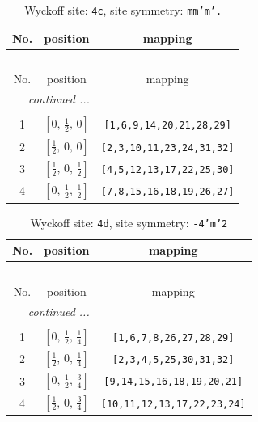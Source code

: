 \documentclass[fleqn,8pt]{jsarticle}
\begin{document}
\renewcommand{\arraystretch}{1.2}
\begin{longtable}{ccc}
\caption{Wyckoff site: {\tt 4c}, site symmetry: {\tt mm'm'.}}
 \\
 \hline \hline
No. & position & mapping \\ \hline \endfirsthead

\multicolumn{2}{l}{\tablename\ \thetable{}} \\
 \hline \hline
No. & position & mapping \\ \hline \endhead

 \hline \hline
\multicolumn{2}{r}{\footnotesize\it continued ...} \\ \endfoot

 \hline \hline
\multicolumn{2}{r}{} \\ \endlastfoot

1 & $\left[ 0,\, \frac{1}{2},\, 0 \right]$ & {\tt [1,6,9,14,20,21,28,29]} \\ \hline
2 & $\left[ \frac{1}{2},\, 0,\, 0 \right]$ & {\tt [2,3,10,11,23,24,31,32]} \\ \hline
3 & $\left[ \frac{1}{2},\, 0,\, \frac{1}{2} \right]$ & {\tt [4,5,12,13,17,22,25,30]} \\ \hline
4 & $\left[ 0,\, \frac{1}{2},\, \frac{1}{2} \right]$ & {\tt [7,8,15,16,18,19,26,27]} \\
\end{longtable}
\renewcommand{\arraystretch}{1.2}
\begin{longtable}{ccc}
\caption{Wyckoff site: {\tt 4d}, site symmetry: {\tt -4'm'2}}
 \\
 \hline \hline
No. & position & mapping \\ \hline \endfirsthead

\multicolumn{2}{l}{\tablename\ \thetable{}} \\
 \hline \hline
No. & position & mapping \\ \hline \endhead

 \hline \hline
\multicolumn{2}{r}{\footnotesize\it continued ...} \\ \endfoot

 \hline \hline
\multicolumn{2}{r}{} \\ \endlastfoot

1 & $\left[ 0,\, \frac{1}{2},\, \frac{1}{4} \right]$ & {\tt [1,6,7,8,26,27,28,29]} \\ \hline
2 & $\left[ \frac{1}{2},\, 0,\, \frac{1}{4} \right]$ & {\tt [2,3,4,5,25,30,31,32]} \\ \hline
3 & $\left[ 0,\, \frac{1}{2},\, \frac{3}{4} \right]$ & {\tt [9,14,15,16,18,19,20,21]} \\ \hline
4 & $\left[ \frac{1}{2},\, 0,\, \frac{3}{4} \right]$ & {\tt [10,11,12,13,17,22,23,24]} \\
\end{longtable}
\end{document}
